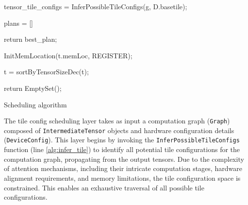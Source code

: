 \begin{algorithm}[t]
    {
    tensor\_tile\_configs = InferPossibleTileConfigs(g, D.basetile);
    \label{alg:infer_tile}

    plans = []
    
    return best\_plan;
    }
    {
        InitMemLocation(t.memLoc, REGISTER);
        \label{alg:initmemloc}
        
        t = sortByTensorSizeDec(t);
        \label{alg:sorttensor}

    return EmptySet();
    \label{alg:return}
    }
\caption{Scheduling algorithm}
\label{alg:schedule}
\end{algorithm}

The tile config scheduling layer takes as input a computation graph (\texttt{Graph}) composed of \texttt{IntermediateTensor} objects and hardware configuration details (\texttt{DeviceConfig}). This layer begins by invoking the \texttt{InferPossibleTileConfigs} function (line \ref{alg:infer_tile}) to identify all potential tile configurations for the computation graph, propagating from the output tensors. Due to the complexity of attention mechanisms, including their intricate computation stages, hardware alignment requirements, and memory limitations, the tile configuration space is constrained. This enables an exhaustive traversal of all possible tile configurations.

